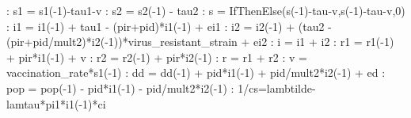 \documentclass{article}%
\begin{document}
   :  s1 = s1({-}1){-}tau1{-}v\newline%
   :  s2 = s2({-}1) {-} tau2\newline%
   :  s  = IfThenElse(s({-}1){-}tau{-}v,s({-}1){-}tau{-}v,0)\newline%
   :  i1 = i1({-}1) + tau1 {-} (pir+pid)*i1({-}1) + ei1\newline%
   :  i2 = i2({-}1) + (tau2 {-} (pir+pid/mult2)*i2({-}1))*virus\_resistant\_strain + ei2\newline%
   :  i = i1 + i2\newline%
   :  r1 = r1({-}1) + pir*i1({-}1) + v\newline%
   :  r2 = r2({-}1) + pir*i2({-}1)\newline%
   :  r  = r1 + r2\newline%
   :  v = vaccination\_rate*s1({-}1)\newline%
   :  dd = dd({-}1) + pid*i1({-}1) + pid/mult2*i2({-}1) + ed\newline%
   :  pop = pop({-}1) {-} pid*i1({-}1) {-} pid/mult2*i2({-}1)\newline%
   :  1/cs=lambtilde{-}lamtau*pi1*i1({-}1)*ci\newline%
\newline%
\end{document}
